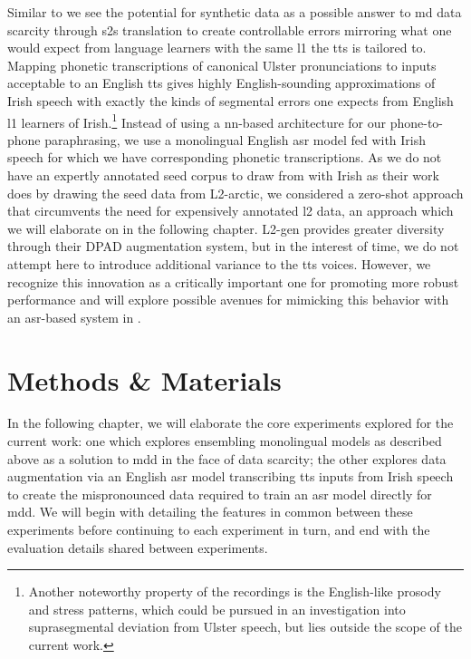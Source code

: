 \documentclass[thesis]{cluu}
\begin{document}
Similar to \textcite{zhangL2GENNeuralPhoneme2022} we see the potential for synthetic data as a possible answer to \gls{md} data scarcity through \gls{s2s} translation to create controllable errors mirroring what one would expect from language learners with the same \gls{l1} the \gls{tts} is tailored to. Mapping phonetic transcriptions of canonical Ulster pronunciations to inputs acceptable to an English \gls{tts} gives highly English-sounding approximations of Irish speech with exactly the kinds of segmental errors one expects from English \gls{l1} learners of Irish.\footnote{Another noteworthy property of the recordings is the English-like prosody and stress patterns, which could be pursued in an investigation into suprasegmental deviation from Ulster speech, but lies outside the scope of the current work.} Instead of using a \gls{nn}-based architecture for our phone-to-phone paraphrasing, we use a monolingual English \gls{asr} model fed with Irish speech for which we have corresponding phonetic transcriptions. As we do not have an expertly annotated seed corpus to draw from with Irish as their work does by drawing the seed data from L2-arctic, we considered a zero-shot approach that circumvents the need for expensively annotated \gls{l2} data, an approach which we will elaborate on in the following chapter. L2-gen provides greater diversity through their DPAD augmentation system, but in the interest of time, we do not attempt here to introduce additional variance to the \gls{tts} voices. However, we recognize this innovation as a critically important one for promoting more robust performance and will explore possible avenues for mimicking this behavior with an \gls{asr}-based system in .

\chapter{Methods \& Materials}
In the following chapter, we will elaborate the core experiments explored for the current work: one which explores ensembling monolingual models as described above as a solution to \gls{mdd} in the face of data scarcity; the other explores data augmentation via an English \gls{asr} model transcribing \gls{tts} inputs from Irish speech to create the mispronounced data required to train an \gls{asr} model directly for \gls{mdd}. We will begin with detailing the features in common between these experiments before continuing to each experiment in turn, and end with the evaluation details shared between experiments.
\end{document}
